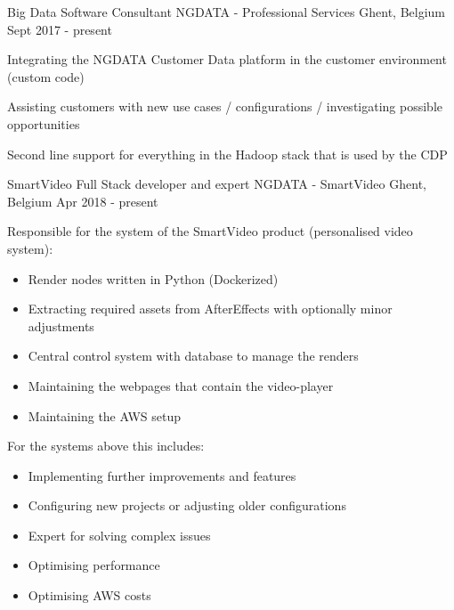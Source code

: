 


\begin{cventries}


\cventry
{Big Data Software Consultant} %
{NGDATA - Professional Services} %
{Ghent, Belgium} %
{Sept 2017 - present} %
{ %
\begin{cvitems}
\item {Integrating the NGDATA Customer Data platform in the customer environment (custom code)}
\item {Assisting customers with new use cases / configurations / investigating possible opportunities}
\item {Second line support for everything in the Hadoop stack that is used by the CDP}
\end{cvitems}
}


\cventry
{SmartVideo Full Stack developer and expert} %
{NGDATA - SmartVideo} %
{Ghent, Belgium} %
{Apr 2018 - present} %
{ %
\begin{cvitems}
\item {Responsible for the system of the SmartVideo product (personalised video system):}
\begin{itemize}
\item {Render nodes written in Python (Dockerized)}
\item {Extracting required assets from AfterEffects with optionally minor adjustments}
\item {Central control system with database to manage the renders}
\item {Maintaining the webpages that contain the video-player}
\item {Maintaining the AWS setup}
\end{itemize}
\item {For the systems above this includes:}
\begin{itemize}
\item {Implementing further improvements and features}
\item {Configuring new projects or adjusting older configurations}
\item {Expert for solving complex issues}
\item {Optimising performance}
\item {Optimising AWS costs}
\end{itemize}
\end{cvitems}
}


\end{cventries}
